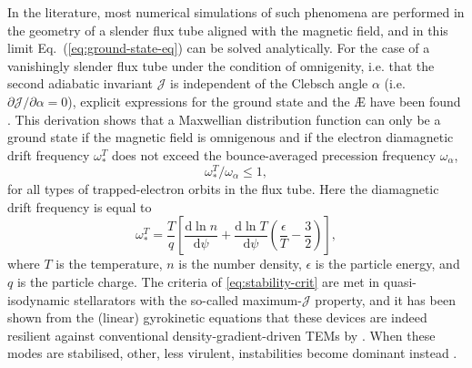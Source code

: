     \par
    In the literature, most numerical simulations of such phenomena are performed in the geometry of a slender flux tube aligned with the magnetic field, and in this limit Eq.~(\ref{eq:ground-state-eq}) can be solved analytically. For the case of a vanishingly slender flux tube under the condition of omnigenity, i.e. that the second adiabatic invariant $\mathcal{J}$ is independent of the Clebsch angle $\alpha$ (i.e. $\partial \mathcal{J} / \partial \alpha = 0$), explicit expressions for the ground state and the \AE{} have been found \citep{Helander2020AvailablePlasmas}. This derivation shows that a Maxwellian distribution function can only be a ground state if the magnetic field is omnigenous and if the electron diamagnetic drift frequency $\omega_*^T$ does not exceed the bounce-averaged precession frequency $\omega_\alpha$,
    \begin{equation}
        \omega_*^T/\omega_\alpha \leq 1,
        \label{eq:stability-crit}
    \end{equation}
    for all types of trapped-electron orbits in the flux tube. Here the diamagnetic drift frequency is equal to
    \begin{equation}
        \omega_*^T = \frac{T}{q} \left[ \frac{\mathrm{d} \ln n}{\mathrm{d} \psi} + \frac{\mathrm{d} \ln T}{\mathrm{d} \psi} \left( \frac{\epsilon}{T} - \frac{3}{2} \right) \right],
    \end{equation}
    where $T$ is the temperature, $n$ is the number density, $\epsilon$ is the particle energy, and $q$ is the particle charge.
    The criteria of \eqref{eq:stability-crit} are met in quasi-isodynamic stellarators with the so-called maximum-$\mathcal{J}$ property, and it has been shown from the (linear) gyrokinetic equations that these devices are indeed resilient against conventional density-gradient-driven TEMs by \citep{Proll2012ResilienceInstabilities,Helander2013CollisionlessModes}. When these modes are stabilised, other, less virulent, instabilities become dominant instead \citep{Helander2015TheGeometry,Plunk2017CollisionlessMode,costello2023universal}.
    \par 

